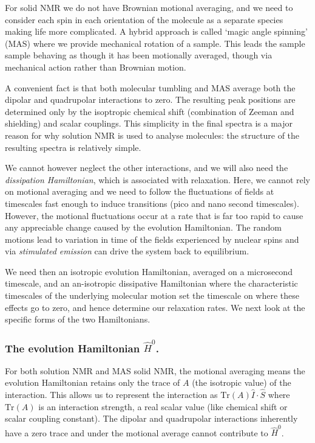 \documentclass[notitlepage,11pt]{article}
\begin{document}
For solid NMR we do not have Brownian motional averaging, and we need to consider each spin in each orientation of the molecule as a separate species making life more complicated. A hybrid approach is called `magic angle spinning' (MAS) where we provide mechanical rotation of a sample. This leads the sample sample behaving as though it has been motionally averaged, though via mechanical action rather than Brownian motion.

A convenient fact is that both molecular tumbling and MAS average both the dipolar and quadrupolar interactions to zero. The resulting peak positions are determined only by the isoptropic chemical shift (combination of Zeeman and shielding) and scalar couplings. This simplicity in the final spectra is a major reason for why solution NMR is used to analyse molecules: the structure of the resulting spectra is relatively simple.

We cannot however neglect the other interactions, and we will also need the \emph{dissipation Hamiltonian}, which is associated with relaxation. Here, we cannot rely on motional averaging and we need to follow the fluctuations of fields at timescales fast enough to induce transitions (pico and nano second timescales). However, the motional fluctuations occur at a rate that is far too rapid to cause any appreciable change caused by the evolution Hamiltonian. The random motions lead to variation in time of the fields experienced by nuclear spins and via \emph{stimulated emission} can drive the system back to equilibrium.

We need then an isotropic evolution Hamiltonian, averaged on a microsecond timescale, and an an-isotropic dissipative Hamiltonian where the characteristic timescales of the underlying molecular motion set the timescale on where these effects go to zero, and hence determine our relaxation rates. We next look at the specific forms of the two Hamiltonians.

\subsubsection{The evolution Hamiltonian $\hat{H}^0$.} For both solution NMR and MAS solid NMR, the motional averaging means the evolution Hamiltonian retains only the trace of $A$ (the isotropic value) of the interaction. This allows us to represent the interaction as $\mathrm{Tr}(A)\hat{I}\cdot\hat{S}$ where $\mathrm{Tr}(A)$ is an interaction strength, a real scalar value (like chemical shift or scalar coupling constant). The dipolar and quadrupolar interactions inherently have a zero trace and under the motional average cannot contribute to $\hat{H}^0$. 
\end{document}
